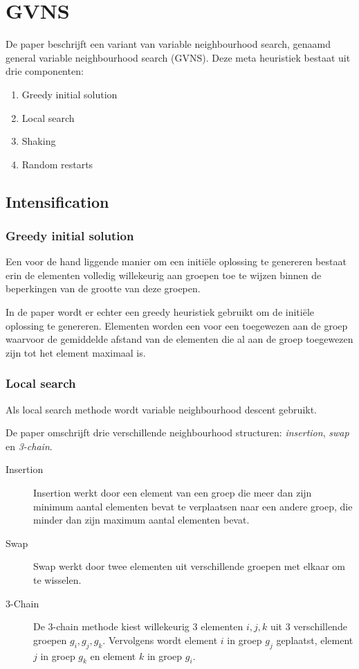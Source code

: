 \documentclass[pdftex,12pt,a4paper]{article}
\begin{document}
\section{GVNS}
De paper beschrijft een variant van variable neighbourhood search, genaamd general variable neighbourhood search (GVNS). Deze meta heuristiek bestaat uit drie componenten:

\begin{enumerate}
\item Greedy initial solution
\item Local search
\item Shaking
\item Random restarts
\end{enumerate}

\subsection{Intensification}
\subsubsection{Greedy initial solution}
Een voor de hand liggende manier om een initi\"ele oplossing te genereren bestaat erin de elementen volledig willekeurig aan groepen toe te wijzen binnen de beperkingen van de grootte van deze groepen.

In de paper wordt er echter een greedy heuristiek gebruikt om de initi\"ele oplossing te genereren.
Elementen worden een voor een toegewezen aan de groep waarvoor de gemiddelde afstand van de elementen die al aan de groep toegewezen zijn tot het element maximaal is.

\subsubsection{Local search}
Als local search methode wordt variable neighbourhood descent gebruikt.

De paper omschrijft drie verschillende neighbourhood structuren: \emph{insertion}, \emph{swap} en \emph{3-chain}.

\begin{description}
\item[Insertion] Insertion werkt door een element van een groep die meer dan zijn minimum aantal elementen bevat te verplaatsen naar een andere groep, die minder dan zijn maximum aantal elementen bevat.
\item[Swap] Swap werkt door twee elementen uit verschillende groepen met elkaar om te wisselen.
\item[3-Chain] De 3-chain methode kiest willekeurig 3 elementen $i, j, k$ uit 3 verschillende groepen $g_{i}, g_{j}, g_{k}$. Vervolgens wordt element $i$ in groep $g_{j}$ geplaatst, element $j$ in groep $g_{k}$ en element $k$ in groep $g_{i}$.
\end{description}
\end{document}
